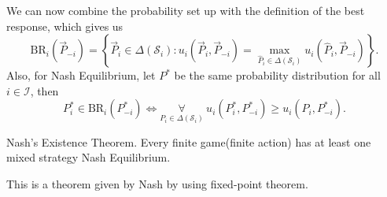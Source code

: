 We can now combine the probability set up with the definition of the best response, which gives us
\[
	\mathrm{BR}_{i}(\overrightarrow{P}_{-i}) = \left\{\overrightarrow{P}_i\in \Delta(\mathcal{S}_i)\colon u_{i}(\overrightarrow{P}_i, \overrightarrow{P}_{-i}) = \max_{\hat{P}_i\in \Delta(\mathcal{S}_i)}u_{i}(\hat{P}_i, \overrightarrow{P}_{-i})\right\}.
\]
Also, for Nash Equilibrium, let \(P^{\ast}\) be the same probability distribution for all \(i\in \mathcal{I} \), then
\[
	P^{\ast}_i\in\mathrm{BR}_i(P^{\ast}_{-i})\iff \underset{P_{i}\in \Delta(\mathcal{S}_i)}{\forall }\ u_{i}(P^{\ast}_i, P^{\ast}_{-i})\geq u_{i}(P_{i}, P^{\ast}_{-i}).
\]

\begin{theorem}
	Nash's Existence Theorem. Every finite game(finite action) has at least one mixed strategy Nash Equilibrium.
\end{theorem}
\begin{remark}
	This is a theorem given by Nash by using fixed-point theorem.
\end{remark}